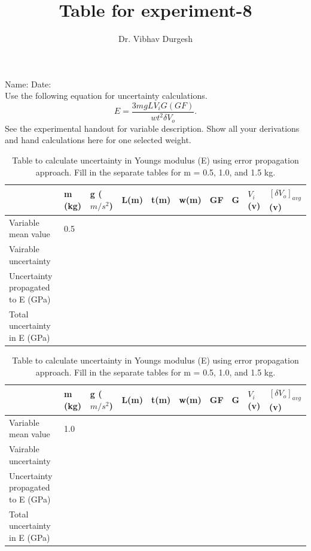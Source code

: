 \documentclass[12pt,a4paper,landscape]{article}
\author{Dr. Vibhav Durgesh}
\title{Table for experiment-8}
\begin{document}
Name: \underline{\hspace{2in}}\hfill Date: \underline{\hspace{1.0in}}\\

\vspace{0.2in}
Use the following equation for uncertainty calculations.
\begin{equation*}
E = \frac{3mgLV_{i}G (GF)}{wt^2 \delta V_{o}}.
\label{fig:ErrEq}
\end{equation*}
See the experimental handout for variable description. Show all your derivations and hand calculations here for one selected weight.
\begin{table}[!ht]
\caption{Table to calculate uncertainty in Youngs modulus (E) using error propagation approach. Fill in the separate tables for m = 0.5, 1.0, and 1.5 kg.}
\label{tab:ErrorPropagation}
\large
\begin{tabular}{|p{8cm}| p{1.5cm}| p{1.6cm}| p{1.5cm}| p{1.5cm}| p{1.5cm}|p{1.5cm}| p{1.5cm}| p{1.5cm}| p{1.75cm}|}
\toprule \toprule
												& m (kg)   & g ($m/s^2$) & L(m) & t(m) & w(m)& GF & G  & $V_i$ (v) & $[\delta V_o]_{avg}$ (v) \\ \toprule
Variable mean value   							 &     0.5 &             &      &      &     &    &    &           &                \\ \hline
Vairable uncertainty                            &         &             &      &      &     &    &    &           &                \\ \hline
Uncertainty propagated to E (GPa) &         &             &      &      &     &    &    &           &                \\ \bottomrule 
Total uncertainty in E (GPa)      & \multicolumn{8}{c}{}   & \\ \bottomrule \bottomrule             
\end{tabular} 

\vspace{0.2in}
\begin{tabular}{|p{8cm}| p{1.5cm}| p{1.6cm}| p{1.5cm}| p{1.5cm}| p{1.5cm}|p{1.5cm}| p{1.5cm}| p{1.5cm}| p{1.75cm}|}
\toprule \toprule
												& m (kg)   & g ($m/s^2$) & L(m) & t(m) & w(m)& GF & G  & $V_i$ (v) & $[\delta V_o]_{avg}$ (v) \\ \toprule
Variable mean value   							 &     1.0 &             &      &      &     &    &    &           &                \\ \hline
Vairable uncertainty                            &         &             &      &      &     &    &    &           &                \\ \hline
Uncertainty propagated to E (GPa) &         &             &      &      &     &    &    &           &                \\ \bottomrule 
Total uncertainty in E (GPa)      & \multicolumn{8}{c}{}   & \\ \bottomrule \bottomrule             
\end{tabular} 


\end{table}
\end{document}
